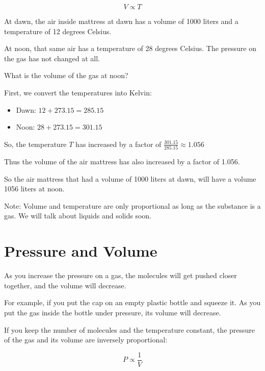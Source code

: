$$V \propto T$$

\begin{Exercise}[title={Temperature and Volume},  label=temp_vol]
  
At dawn, the air inside mattress at dawn has a volume of 1000 liters and a temperature of 12 degrees Celsius.

At noon,  that same air has a temperature of 28 degrees Celsius.  The pressure on the gas has not changed at all.

What is the volume of the gas at noon?

\end{Exercise}
\begin{Answer}[ref=temp_vol]

First, we convert the temperatures into Kelvin:  
\begin{itemize}
\item Dawn: $12 + 273.15 = 285.15$
\item Noon: $28 + 273.15 = 301.15$
\end{itemize}

So, the temperature $T$ has increased by a factor of $\frac{301.15}{285.15} \approx 1.056$

Thus the volume of the air mattress has also increased by a factor of 1.056.  

So the air mattress that had a volume of 1000 liters at dawn,  will have a volume 1056 liters at noon.

\end{Answer}

Note: Volume and temperature are only proportional as long as the substance is a gas.   We will talk about liquids and solids soon.

\section{Pressure and Volume}

As you increase the pressure on a gas,  the molecules will get pushed closer together,  and the volume will decrease.

For example,  if you put the cap on an empty plastic bottle and squeeze it.   As you put the gas inside the bottle under pressure,  its volume will decrease. 

If you keep the number of molecules and the temperature constant,  the pressure of the gas and its volume are inversely proportional:

$$P \propto \frac{1}{V}$$

